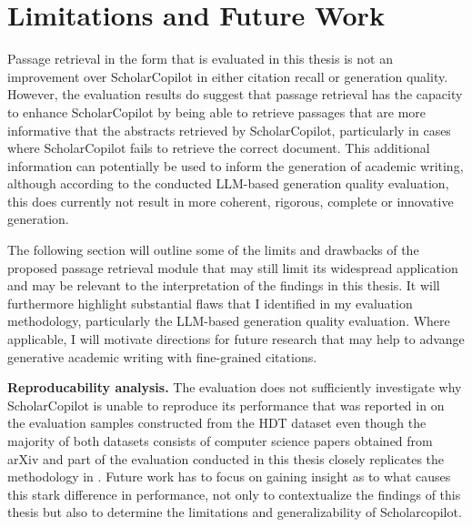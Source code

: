 \chapter{Limitations and Future Work}\label{limitations-future-work}
Passage retrieval in the form that is evaluated in this thesis is not an improvement over ScholarCopilot in either citation recall or generation quality. However, the evaluation results do suggest that passage retrieval has the capacity to enhance ScholarCopilot by being able to retrieve passages that are more informative that the abstracts retrieved by ScholarCopilot, particularly in cases where ScholarCopilot fails to retrieve the correct document. This additional information can potentially be used to inform the generation of academic writing, although according to the conducted LLM-based generation quality evaluation, this does currently not result in more coherent, rigorous, complete or innovative generation.

The following section will outline some of the limits and drawbacks of the proposed passage retrieval module that may still limit its widespread application and may be relevant to the interpretation of the findings in this thesis. It will furthermore highlight substantial flaws that I identified in my evaluation methodology, particularly the LLM-based generation quality evaluation. Where applicable, I will motivate directions for future research that may help to advange generative academic writing with fine-grained citations.  

\textbf{Reproducability analysis.} The evaluation does not sufficiently investigate why ScholarCopilot is unable to reproduce its performance that was reported in \cite{wang2025scholarcopilot} on the evaluation samples constructed from the HDT dataset even though the majority of both datasets consists of computer science papers obtained from arXiv and part of the evaluation conducted in this thesis closely replicates the methodology in \cite{wang2025scholarcopilot}. Future work has to focus on gaining insight as to what causes this stark difference in performance, not only to contextualize the findings of this thesis but also to determine the limitations and generalizability of Scholarcopilot.

